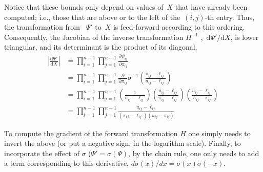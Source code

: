\documentclass[twoside]{article}
\begin{document}
Notice that these bounds only depend on values of~$X$ that
have already been computed; i.e., those that are above or to the left of
the~$(i,j)$-th entry. Thus, the transformation from ~$\Psi'$ to~$X$
is feed-forward according to this ordering.  Consequently, the
Jacobian of the inverse transformation $H^{-1}$ ,~$\mathrm{d}\Psi' / \mathrm{d} X$,
is lower triangular, and its determinant is the product of its diagonal,
\begin{align}
\nonumber \left| \frac{\mathrm{d} \Psi'} {\mathrm{d} X} \right|
&= \prod_{i=1}^{n-1} \prod_{j=1}^{n-1} \frac{\partial \psi_{ij} }{\partial {\pi}_{ij}} \\
\nonumber &= \prod_{i=1}^{n-1} \prod_{j=1}^{n-1} \frac{\partial}{\partial {\pi}_{ij}}
\sigma^{-1} \left( \frac{{\pi}_{ij} - \ell_{ij}}{u_{ij} - \ell_{ij}} \right ) \\
\nonumber &= \prod_{i=1}^{n-1} \prod_{j=1}^{n-1}
\left( \frac{1}{u_{ij} - \ell_{ij}} \right )
\left( \frac{u_{ij} - \ell_{ij}}{{\pi}_{ij} - \ell_{ij}} \right )
\left( \frac{u_{ij} - \ell_{ij}}{u_{ij} - {\pi}_{ij}} \right ) \\
\nonumber &= \prod_{i=1}^{n-1} \prod_{j=1}^{n-1}
\frac{u_{ij} - \ell_{ij}}{({\pi}_{ij} - \ell_{ij}) (u_{ij} - {\pi}_{ij})}
\end{align}

To compute the gradient of the forward transformation $H$ one simply needs to invert the above (or put a negative sign, in the logarithm scale). Finally,  to incorporate the effect of $\sigma$ ($\Psi'=\sigma(\Psi)$, by the chain rule,  one only needs to add a term corresponding to this derivative, $d\sigma(x)/dx=\sigma(x)\sigma(-x)$. 
\end{document}

